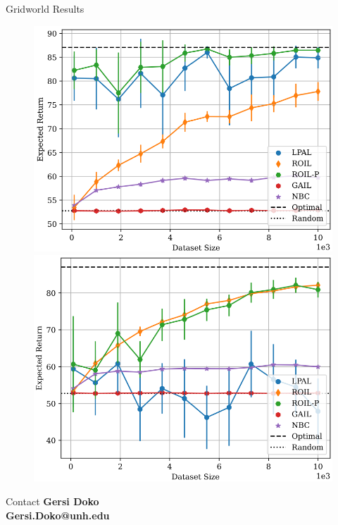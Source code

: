 \documentclass[final,a0paper]{beamer}
\begin{document}
\begin{frame}{}
\begin{columns}[t]
  \begin{column}{0.3\linewidth}
    \begin{block}{Gridworld Results}
        \begin{center}
            \begin{figure}
                \includegraphics[scale=1.6]{../../pres_roil/plots/returns/40x40_gridworld_on_policy_returns_cropped.pdf}
                \includegraphics[scale=1.6]{../../pres_roil/plots/returns/40x40_gridworld_off_policy_returns_cropped.pdf}
            \end{figure}
        \end{center}
    \end{block}

    \begin{block}{Contact}
        \textbf{Gersi Doko}\\
        \textbf{Gersi.Doko@unh.edu}
    \end{block}
  \end{column}
\end{columns}
\end{frame}
\end{document}
